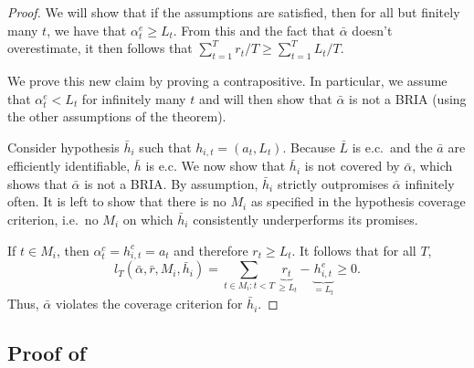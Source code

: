 \documentclass[submission,copyright,creativecommons]{eptcs}
\begin{document}
\begin{proof}
We will show that if the assumptions are satisfied, then for all but finitely many $t$, we have that $\alpha_t^e\geq L_t$. From this and the fact that $\bar \alpha$ doesn't overestimate, it then follows that $\sum_{t=1}^T r_t / T\geq \sum_{t=1}^T L_t / T$.

We prove this new claim by proving a contrapositive. In particular, we assume that $\alpha^e_t  < L_t$ for infinitely many $t$ and will then show that $\bar \alpha$ is not a BRIA (using the other assumptions of the theorem).

Consider hypothesis $\bar h_i$ such that $h_{i,t}=(a_t,L_t)$. Because $\bar L$ is e.c.\ and the $\bar a$ are efficiently identifiable, $\bar h$ is e.c. We now show that $\bar h_i$ is not covered by $\bar \alpha$, which shows that $\bar\alpha$ is not a BRIA. By assumption, $\bar h_i$ strictly outpromises $\bar \alpha$ infinitely often. It is left to show that there is no $M_i$ as specified in the hypothesis coverage criterion, i.e.\ no $M_i$ on which $\bar h_i$ consistently underperforms its promises.

If $t\in M_i$, then $\alpha_t^c=h_{i,t}^c=a_t$ and therefore $r_t\geq L_t$. It follows that for all $T$,
\begin{equation*}
    l_T(\bar \alpha,\bar r,M_i,\bar h_i)=\sum_{t\in M_i:t<T}  \underbrace{r_t}_{\geq L_t} - \underbrace{h_{i,t}^e}_{=L_t} \geq 0.
\end{equation*}
Thus, $\bar\alpha$ violates the coverage criterion for $\bar h_i$.
\end{proof}

\subsection{Proof of }

\vMWCdef*

\pseudolotteriesthm*

%
\end{document}
